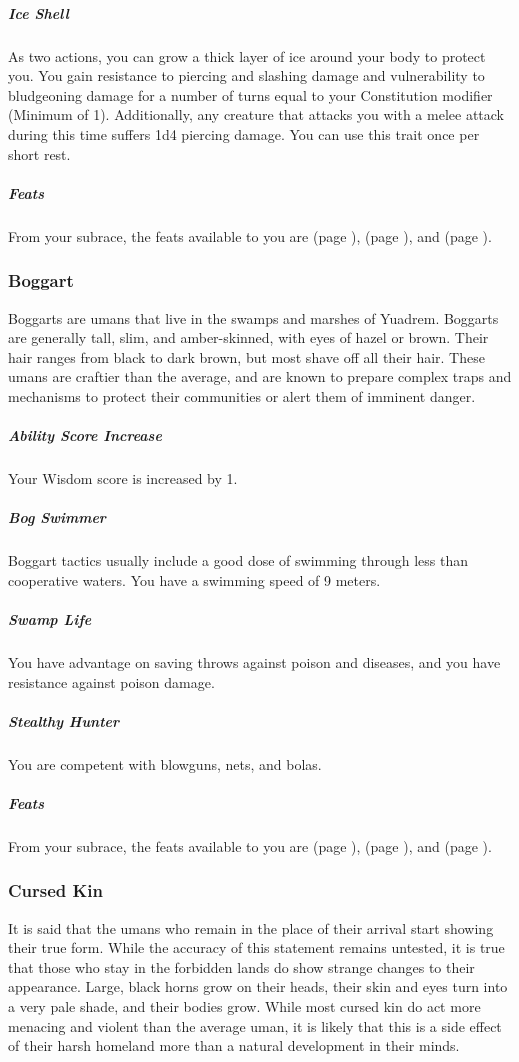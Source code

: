     \subparagraph{Ice Shell} As two actions, you can grow a thick layer of ice around your body to protect you.
    You gain resistance to piercing and slashing damage and vulnerability to bludgeoning damage for a number of turns equal to your Constitution modifier (Minimum of 1).
    Additionally, any creature that attacks you with a melee attack during this time suffers 1d4 piercing damage.
    You can use this trait once per short rest.

    \subparagraph{Feats} From your subrace, the feats available to you are
    \textbf{} (page \pageref{feat::}),
    \textbf{} (page \pageref{feat::}), and
    \textbf{} (page \pageref{feat::}).

\subsubsection{Boggart}
    Boggarts are umans that live in the swamps and marshes of Yuadrem.
    Boggarts are generally tall, slim, and amber-skinned, with eyes of hazel or brown.
    Their hair ranges from black to dark brown, but most shave off all their hair.
    These umans are craftier than the average, and are known to prepare complex traps and mechanisms to protect their communities or alert them of imminent danger.

    \subparagraph{Ability Score Increase} Your Wisdom score is increased by 1.

    \subparagraph{Bog Swimmer} Boggart tactics usually include a good dose of swimming through less than cooperative waters.
    You have a swimming speed of 9 meters.

    \subparagraph{Swamp Life} You have advantage on saving throws against poison and diseases, and you have resistance against poison damage.

    \subparagraph{Stealthy Hunter} You are competent with blowguns, nets, and bolas.

    \subparagraph{Feats} From your subrace, the feats available to you are
    \textbf{} (page \pageref{feat::}),
    \textbf{} (page \pageref{feat::}), and
    \textbf{} (page \pageref{feat::}).

\subsubsection{Cursed Kin}
    It is said that the umans who remain in the place of their arrival start showing their true form.
    While the accuracy of this statement remains untested, it is true that those who stay in the forbidden lands do show strange changes to their appearance.
    Large, black horns grow on their heads, their skin and eyes turn into a very pale shade, and their bodies grow.
    While most cursed kin do act more menacing and violent than the average uman, it is likely that this is a side effect of their harsh homeland more than a natural development in their minds.

